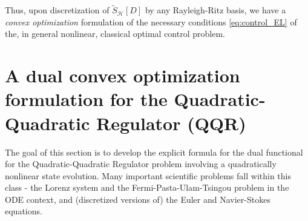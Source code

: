 \documentclass[11pt]{article}
\newcommand{\sch}{\mathcal{H}}
\begin{document}
Thus, upon discretization of $\tilde{S}_\sch[D]$ by any Rayleigh-Ritz basis, we have a \emph{convex optimization} formulation of the necessary conditions \eqref{eq:control_EL} of the, in general nonlinear, classical optimal control problem.

\section{A dual convex optimization formulation for the Quadratic-\\Quadratic Regulator (QQR)}\label{sec:QQR}
The goal of this section is to develop the explicit formula for the dual functional for the Quadratic-Quadratic Regulator problem \cite{borggaard2020quadratic,krener} involving a quadratically nonlinear state evolution. Many important scientific problems fall within this class - the Lorenz system \cite{lorenz1963deterministic} and the Fermi-Pasta-Ulam-Tsingou problem \cite{fermi1955studies} in the ODE context, and (discretized versions of) the Euler and Navier-Stokes equations.
\end{document}
